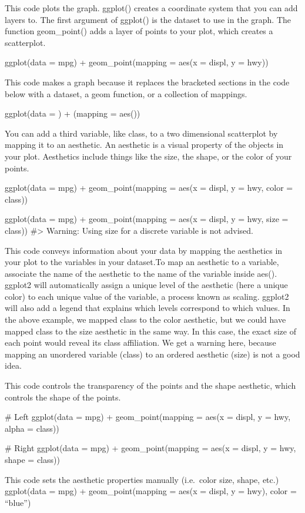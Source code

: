 \documentclass[
]{article}
\begin{document}
This code plots the graph. ggplot() creates a coordinate system that you
can add layers to. The first argument of ggplot() is the dataset to use
in the graph. The function geom\_point() adds a layer of points to your
plot, which creates a scatterplot.

ggplot(data = mpg) + geom\_point(mapping = aes(x = displ, y = hwy))

This code makes a graph because it replaces the bracketed sections in
the code below with a dataset, a geom function, or a collection of
mappings.

ggplot(data = ) + (mapping = aes())

You can add a third variable, like class, to a two dimensional
scatterplot by mapping it to an aesthetic. An aesthetic is a visual
property of the objects in your plot. Aesthetics include things like the
size, the shape, or the color of your points.

ggplot(data = mpg) + geom\_point(mapping = aes(x = displ, y = hwy, color
= class))

ggplot(data = mpg) + geom\_point(mapping = aes(x = displ, y = hwy, size
= class)) \#\textgreater{} Warning: Using size for a discrete variable
is not advised.

This code conveys information about your data by mapping the aesthetics
in your plot to the variables in your dataset.To map an aesthetic to a
variable, associate the name of the aesthetic to the name of the
variable inside aes(). ggplot2 will automatically assign a unique level
of the aesthetic (here a unique color) to each unique value of the
variable, a process known as scaling. ggplot2 will also add a legend
that explains which levels correspond to which values. In the above
example, we mapped class to the color aesthetic, but we could have
mapped class to the size aesthetic in the same way. In this case, the
exact size of each point would reveal its class affiliation. We get a
warning here, because mapping an unordered variable (class) to an
ordered aesthetic (size) is not a good idea.

This code controls the transparency of the points and the shape
aesthetic, which controls the shape of the points.

\# Left ggplot(data = mpg) + geom\_point(mapping = aes(x = displ, y =
hwy, alpha = class))

\# Right ggplot(data = mpg) + geom\_point(mapping = aes(x = displ, y =
hwy, shape = class))

This code sets the aesthetic properties manually (i.e.~color size,
shape, etc.) ggplot(data = mpg) + geom\_point(mapping = aes(x = displ, y
= hwy), color = ``blue'')
\end{document}
